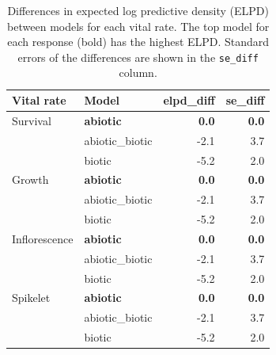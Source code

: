 \documentclass[12pt]{article}\usepackage[]{graphicx}\usepackage[dvipsnames]{xcolor}
\begin{document}
%
\begin{table}[H]
\caption{Differences in expected log predictive density (ELPD) between models for each vital rate. The top model for each response (bold) has the highest ELPD. Standard errors of the differences are shown in the \texttt{se\_diff} column.}
\centering
\begin{tabular}{|l|l|r|r|}
\hline
\textbf{Vital rate} & \textbf{Model} & \textbf{elpd\_diff} & \textbf{se\_diff} \\
\hline
Survival   & \textbf{abiotic}       & \textbf{0.0}  & \textbf{0.0} \\
           & abiotic\_biotic        & -2.1          & 3.7          \\
           & biotic                 & -5.2          & 2.0          \\
\hline
Growth     & \textbf{abiotic}       & \textbf{0.0}  & \textbf{0.0} \\
           & abiotic\_biotic        & -2.1          & 3.7          \\
           & biotic                 & -5.2          & 2.0          \\
\hline
Inflorescence & \textbf{abiotic}     & \textbf{0.0}  & \textbf{0.0} \\
              & abiotic\_biotic      & -2.1          & 3.7          \\
              & biotic               & -5.2          & 2.0          \\
\hline
Spikelet   & \textbf{abiotic}       & \textbf{0.0}  & \textbf{0.0} \\
           & abiotic\_biotic        & -2.1          & 3.7          \\
           & biotic                 & -5.2          & 2.0          \\
\hline
\end{tabular}
\label{tab:elpd_vital_rates}
\end{table}
\end{document}
